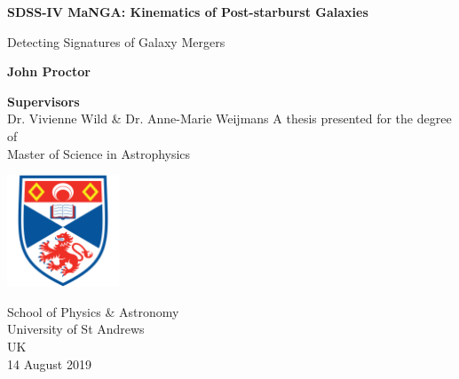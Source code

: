 
\begin{titlepage}
   \begin{center}
       \vspace*{1cm}
        
       \Huge
       \textbf{SDSS-IV MaNGA: Kinematics of Post-starburst Galaxies}
 
       \vspace{0.5cm}
       \huge
       Detecting Signatures of Galaxy Mergers 
       \vspace{1.5cm}
 
       \textbf{John Proctor}
       \vfill
       
       \textbf{Supervisors}\\
       Dr. Vivienne Wild \& Dr. Anne-Marie Weijmans
       \vfill
       A thesis presented for the degree of\\
       Master of Science in Astrophysics
 
       \vspace{2.5cm}
 
       \includegraphics[width=0.25\textwidth]{images/University-of-st-andrews-shield.png}
 
       \vspace{2.5cm}
       
       \Large
       School of Physics \& Astronomy\\
       University of St Andrews\\
       UK\\
       14 August 2019
   \end{center}
   
   
\end{titlepage}






